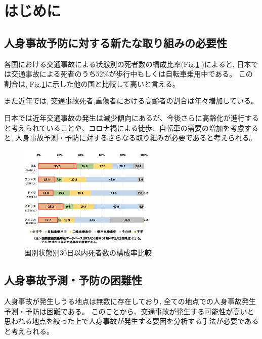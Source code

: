 \documentclass[a4j,8.5pt, twocolumn,fleqn]{jbook}
\begin{document}
\Atitle
\small
\vspace*{-2mm}


\section{はじめに}
\subsection{人身事故予防に対する新たな取り組みの必要性}
各国における交通事故による状態別の死者数の構成比率(Fig.\ref{国別状態別30日以内死者数の構成率比較}
)によると, 日本では交通事故による死者のうち52\%が歩行中もしくは自転車乗用中である。
この割合は, Fig.\ref{国別状態別30日以内死者数の構成率比較}に示した他の国と比較して高いと言える。

また近年では, 交通事故死者,重傷者における高齢者の割合は年々増加している\cite{令和3年における交通事故の発生状況等について}。

日本では近年交通事故の発生は減少傾向にあるが、今後さらに高齢化が進行すると考えられていることや、コロナ禍による徒歩、自転車の需要の増加\cite{自転車を巡る現状等}を考慮すると, 人身事故予測・予防に対するさらなる取り組みが必要であると考えられる。

\begin{figure}[htb]
    \centering
    \includegraphics[height=50mm]{images/pngs/shibou_status.png}
    \vspace{-3mm}
    \caption{国別状態別30日以内死者数の構成率比較\cite{令和3年における交通事故の発生状況等について}}
    \label{国別状態別30日以内死者数の構成率比較}
\end{figure}

\subsection{人身事故予測・予防の困難性}
人身事故が発生しうる地点は無数に存在しており, 全ての地点での人身事故発生予測・予防は困難である。
このことから、交通事故が発生する可能性が高いと思われる地点を絞った上で人身事故が発生する要因を分析する手法が必要であると考えられる。
\end{document}
